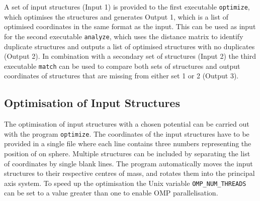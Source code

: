 %
A set of input structures (Input 1) is provided to the first executable
\texttt{optimize}, which optimises the structures and generates Output 1, which
is a list of optimised coordinates in the same format as the input. This can be
used as input for the second executable \texttt{analyze}, which uses the
distance matrix to identify duplicate structures and outputs a list of
optimised structures with no duplicates (Output 2). In combination with a
secondary set of structures (Input 2) the third executable \texttt{match} can
be used to compare both sets of structures and output coordinates of structures
that are missing from either set 1 or 2 (Output 3). 

\subsection{Optimisation of Input Structures}
\label{sec:optimisationofinputstructures}

The optimisation of input structures with a chosen potential can be carried out
with the program \texttt{optimize}. The coordinates of the input structures
have to be provided in a single file where each line contains three numbers
representing the position of on sphere. Multiple structures can be included by
separating the list of coordinates by single blank lines. The program
automatically moves the input structures to their respective centres of mass,
and rotates them into the principal axis system. To speed up the optimisation
the Unix variable \texttt{OMP\_NUM\_THREADS} can be set to a value
greater than one to enable \ac{OMP} parallelisation.

